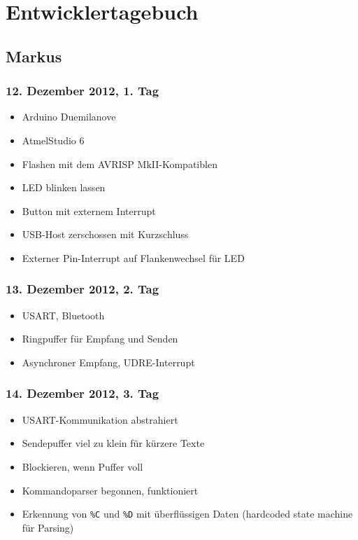 \chapter{Entwicklertagebuch}

\section{Markus}

\subsection{12. Dezember 2012, 1. Tag}

\begin{itemize}
	\item Arduino Duemilanove
	\item AtmelStudio 6
	\item Flashen mit dem AVRISP MkII-Kompatiblen
	\item LED blinken lassen
	\item Button mit externem Interrupt
	\item USB-Host zerschossen mit Kurzschluss
	\item Externer Pin-Interrupt auf Flankenwechsel für LED
\end{itemize}

\subsection{13. Dezember 2012, 2. Tag}

\begin{itemize}
	\item USART, Bluetooth
	\item Ringpuffer für Empfang und Senden
	\item Asynchroner Empfang, UDRE-Interrupt
\end{itemize}

\subsection{14. Dezember 2012, 3. Tag}

\begin{itemize}
	\item USART-Kommunikation abstrahiert
	\item Sendepuffer viel zu klein für kürzere Texte
	\item Blockieren, wenn Puffer voll
	\item Kommandoparser begonnen, funktioniert
	\item Erkennung von \texttt{\%C} und \texttt{\%D} mit überflüssigen Daten (hardcoded state machine für Parsing)
\end{itemize}

